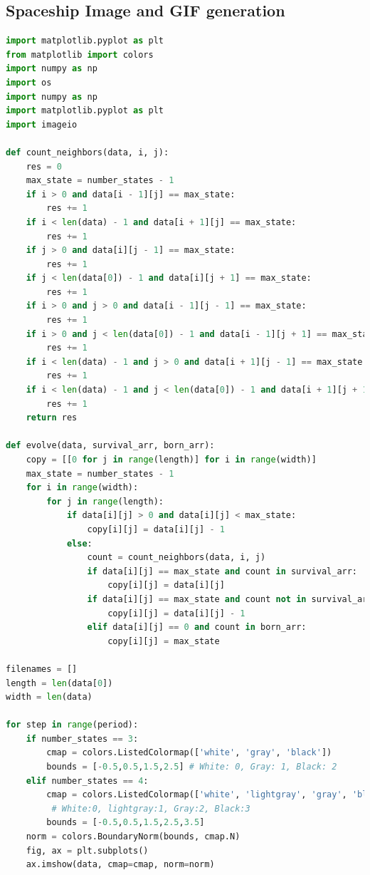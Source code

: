 \documentclass[12pt]{article}
\numberwithin{figure}{section} %
\begin{document}
\subsection{Spaceship Image and GIF generation}
\label{subsection:Spaceship Image and GIF generation}
\begin{lstlisting}[language = Python]
import matplotlib.pyplot as plt
from matplotlib import colors
import numpy as np
import os
import numpy as np
import matplotlib.pyplot as plt
import imageio

def count_neighbors(data, i, j):
    res = 0
    max_state = number_states - 1
    if i > 0 and data[i - 1][j] == max_state:
        res += 1
    if i < len(data) - 1 and data[i + 1][j] == max_state:
        res += 1
    if j > 0 and data[i][j - 1] == max_state:
        res += 1
    if j < len(data[0]) - 1 and data[i][j + 1] == max_state:
        res += 1
    if i > 0 and j > 0 and data[i - 1][j - 1] == max_state: 
        res += 1
    if i > 0 and j < len(data[0]) - 1 and data[i - 1][j + 1] == max_state:
        res += 1
    if i < len(data) - 1 and j > 0 and data[i + 1][j - 1] == max_state:
        res += 1
    if i < len(data) - 1 and j < len(data[0]) - 1 and data[i + 1][j + 1] == max_state:
        res += 1
    return res

def evolve(data, survival_arr, born_arr): 
    copy = [[0 for j in range(length)] for i in range(width)]
    max_state = number_states - 1
    for i in range(width):
        for j in range(length):
            if data[i][j] > 0 and data[i][j] < max_state: 
                copy[i][j] = data[i][j] - 1
            else: 
                count = count_neighbors(data, i, j)
                if data[i][j] == max_state and count in survival_arr: 
                    copy[i][j] = data[i][j]
                if data[i][j] == max_state and count not in survival_arr: 
                    copy[i][j] = data[i][j] - 1
                elif data[i][j] == 0 and count in born_arr:
                    copy[i][j] = max_state

filenames = []
length = len(data[0])
width = len(data)

for step in range(period): 
    if number_states == 3: 
        cmap = colors.ListedColormap(['white', 'gray', 'black'])
        bounds = [-0.5,0.5,1.5,2.5] # White: 0, Gray: 1, Black: 2
    elif number_states == 4: 
        cmap = colors.ListedColormap(['white', 'lightgray', 'gray', 'black'])
	     # White:0, lightgray:1, Gray:2, Black:3
        bounds = [-0.5,0.5,1.5,2.5,3.5] 
    norm = colors.BoundaryNorm(bounds, cmap.N)
    fig, ax = plt.subplots()
    ax.imshow(data, cmap=cmap, norm=norm)


\end{lstlisting}
\end{document}

